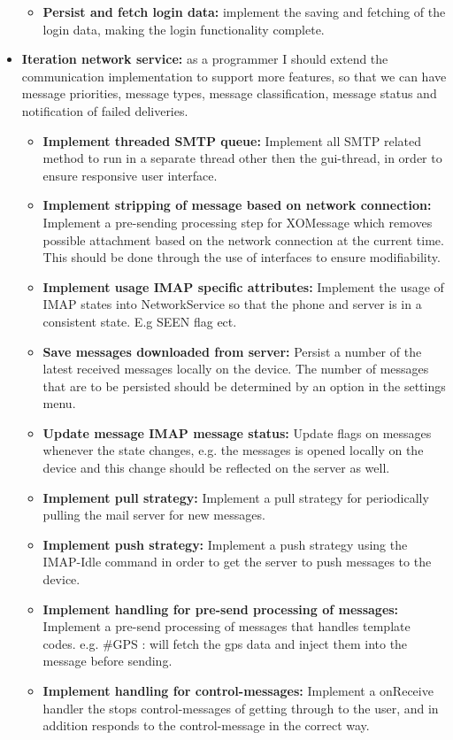 \begin{itemize}
\begin{itemize}
\item{}\textbf{Persist and fetch login data:} implement the saving and fetching of the login data, making the login functionality complete.
\end{itemize}
\item{}\textbf{Iteration network service:} as a programmer I should extend the communication implementation to support more features, so that we can have message priorities, message types, message classification, message status and notification of failed deliveries.
\begin{itemize}
\item{}\textbf{Implement threaded SMTP queue:} Implement all SMTP related method to run in a separate thread other then the gui-thread, in order to ensure responsive user interface.
\item{}\textbf{Implement stripping of message based on network connection:} Implement a pre-sending processing step for XOMessage which removes possible attachment based on the network connection at the current time. This should be done through the use of interfaces to ensure modifiability. 
\item{}\textbf{Implement usage IMAP specific attributes:} Implement the usage of IMAP states into NetworkService so that the phone and server is in a consistent state. E.g SEEN flag ect. 
\item{}\textbf{Save messages downloaded from server:} Persist a number of the latest received messages locally on the device. The number of messages that are to be persisted should be determined by an option in the settings menu.
\item{}\textbf{Update message IMAP message status:} Update flags on messages whenever the state changes, e.g. the messages is opened locally on the device and this change should be reflected on the server as well.
\item{}\textbf{Implement pull strategy:} Implement a pull strategy for periodically pulling the mail server for new messages.
\item{}\textbf{Implement push strategy:} Implement a push strategy using the IMAP-Idle command in order to get the server to push messages to the device. 
\item{}\textbf{Implement handling for pre-send processing of messages:} Implement a pre-send processing of messages that handles template codes. e.g. \#GPS : will fetch the gps data and inject them into the message before sending. 
\item{}\textbf{Implement handling for control-messages:} Implement a onReceive handler the stops control-messages of getting through to the user, and in addition responds to the control-message in the correct way.

\end{itemize}
\end{itemize}
